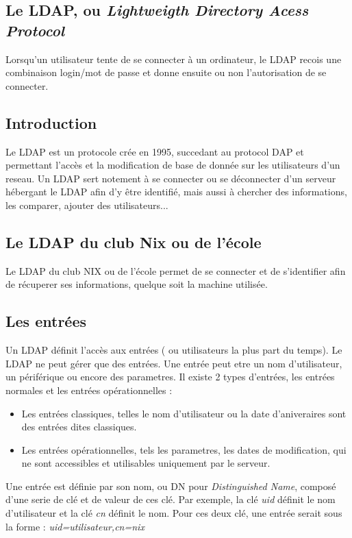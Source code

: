 \subsection{Le LDAP, ou \textit{Lightweigth Directory Acess Protocol}}
Lorsqu'un utilisateur tente de se connecter à un ordinateur, le LDAP recois une combinaison login/mot de passe et donne ensuite ou non l'autorisation de se connecter.
\subsection{Introduction}
Le LDAP est un protocole crée en 1995, succedant au protocol DAP et permettant l'accès et la modification de base de donnée sur les utilisateurs d'un reseau. Un LDAP sert notement à se connecter ou se déconnecter d'un serveur hébergant le LDAP afin d'y être identifié, mais aussi à chercher des informations, les comparer, ajouter des utilisateurs...
\subsection{Le LDAP du club Nix ou de l'école}
Le LDAP du club NIX ou de l'école permet de se connecter et de s'identifier afin de récuperer ses informations, quelque soit la machine utilisée.
\subsection{Les entrées}
Un LDAP définit l'accès aux entrées ( ou utilisateurs la plus part du temps).
Le LDAP ne peut gérer que des entrées. Une entrée peut etre un nom d'utilisateur, un périférique ou encore des parametres. Il existe 2 types d'entrées, les entrées normales et les entrées opérationnelles :
\begin{itemize}
    \item Les entrées classiques, telles le nom d'utilisateur ou la date d'aniveraires sont des entrées dites classiques.
    \item Les entrées opérationnelles, tels les parametres, les dates de modification, qui ne sont accessibles et utilisables uniquement par le serveur.
\end{itemize}
Une entrée est définie par son nom, ou DN pour \textit{Distinguished Name}, composé d'une serie de clé et de valeur de ces clé. Par exemple, la clé \textit{uid} définit le nom d'utilisateur et la clé \textit{cn} définit le nom. Pour ces deux clé, une entrée serait sous la forme : \textit{uid=utilisateur,cn=nix}
